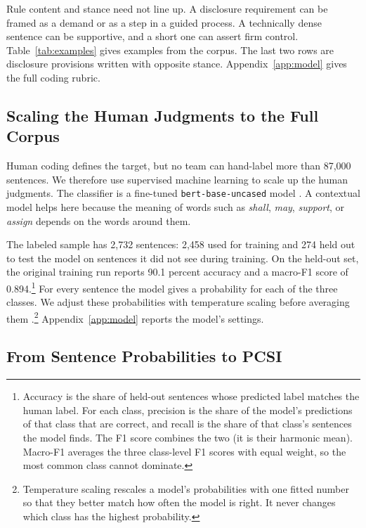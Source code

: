 \documentclass[11pt]{article}
\begin{document}
Rule content and stance need not line up. A disclosure requirement can be framed as a demand or as a step in a guided process. A technically dense sentence can be supportive, and a short one can assert firm control. Table~\ref{tab:examples} gives examples from the corpus. The last two rows are disclosure provisions written with opposite stance. Appendix~\ref{app:model} gives the full coding rubric.



\subsection{Scaling the Human Judgments to the Full Corpus}

Human coding defines the target, but no team can hand-label more than 87,000 sentences. We therefore use supervised machine learning to scale up the human judgments. The classifier is a fine-tuned \texttt{bert-base-uncased} model \citep{devlin2019bert}. A contextual model helps here because the meaning of words such as \emph{shall}, \emph{may}, \emph{support}, or \emph{assign} depends on the words around them.

The labeled sample has 2,732 sentences: 2,458 used for training and 274 held out to test the model on sentences it did not see during training. On the held-out set, the original training run reports 90.1 percent accuracy and a macro-F1 score of 0.894.\footnote{Accuracy is the share of held-out sentences whose predicted label matches the human label. For each class, precision is the share of the model's predictions of that class that are correct, and recall is the share of that class's sentences the model finds. The F1 score combines the two (it is their harmonic mean). Macro-F1 averages the three class-level F1 scores with equal weight, so the most common class cannot dominate.} For every sentence the model gives a probability for each of the three classes. We adjust these probabilities with temperature scaling before averaging them \citep{guo2017calibration}.\footnote{Temperature scaling rescales a model's probabilities with one fitted number so that they better match how often the model is right. It never changes which class has the highest probability.} Appendix~\ref{app:model} reports the model's settings.

\subsection{From Sentence Probabilities to PCSI}
\end{document}
